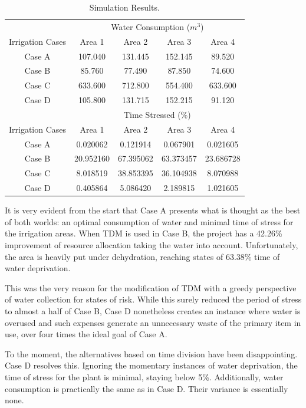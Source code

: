 \documentclass[12pt]{article}
\begin{document}
\begin{table}[ht]
\centering

\begin{tabular}{|c|c|c|c|c|}
\hline
& \multicolumn{4}{c|}{Water Consumption ($m^3$)} \\
\cline{2-5}
Irrigation Cases & Area 1 & Area 2 & Area 3 & Area 4 \\
\hline
Case A & 107.040 & 131.445 & 152.145 & 89.520 \\
\hline
Case B & 85.760 & 77.490 & 87.850 & 74.600 \\
\hline
Case C & 633.600 & 712.800 & 554.400 & 633.600 \\
\hline
Case D & 105.800 & 131.715 & 152.215 & 91.120 \\
\hline\hline
& \multicolumn{4}{c|}{Time Stressed (\%)} \\
\cline{2-5}
Irrigation Cases & Area 1 & Area 2 & Area 3 & Area 4 \\
\hline
Case A & 0.020062 & 0.121914 & 0.067901 & 0.021605 \\
\hline
Case B & 20.952160 & 67.395062 & 63.373457 & 23.686728 \\
\hline
Case C & 8.018519 & 38.853395 & 36.104938 & 8.070988 \\
\hline
Case D & 0.405864 & 5.086420 & 2.189815 & 1.021605 \\
\hline
\end{tabular}

\caption{Simulation Results.}
\label{tab:results}
\end{table}

It is very evident from the start that Case A presents what is thought as the best of both worlds: an optimal consumption of water and minimal time of stress for the irrigation areas. When TDM is used in Case B, the project has a 42.26\% improvement of resource allocation taking the water into account. Unfortunately, the area is heavily put under dehydration, reaching states of 63.38\% time of water deprivation. 

This was the very reason for the modification of TDM with a greedy perspective of water collection for states of risk. While this surely reduced the period of stress to almost a half of Case B, Case D nonetheless creates an instance where water is overused and such expenses generate an unnecessary waste of the primary item in use, over four times the ideal goal of Case A.

To the moment, the alternatives based on time division have been disappointing. Case D resolves this. Ignoring the momentary instances of water deprivation, the time of stress for the plant is minimal, staying below 5\%. Additionally, water consumption is practically the same as in Case D. Their variance is essentially none.
\end{document}
